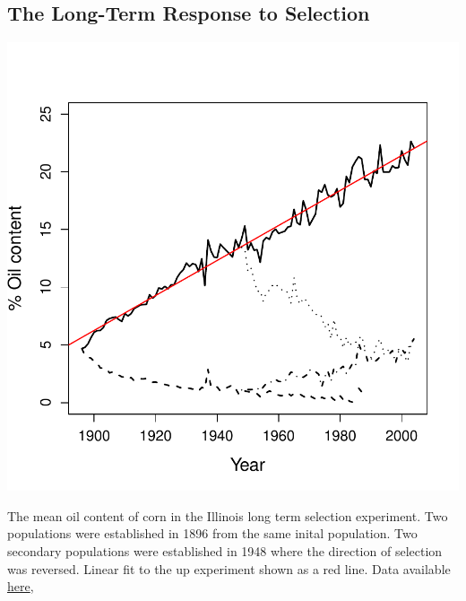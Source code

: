  \subsection{The Long-Term Response to Selection}
   \begin{marginfigure}
 \begin{center}
 \includegraphics[width=\textwidth]{Journal_figs/Quant_gen/Illinois_long_term_selection_corn/Illinois_LTS_means.pdf} \end{center}
 \caption[2cm]{The mean oil content of corn in the Illinois long term
   selection experiment. Two populations were established in 1896 from
 the same inital population. Two secondary populations were
 established in 1948 where the direction of selection was reversed.
 Linear fit to the up experiment shown as a red line. Data available \href{https://www.ideals.illinois.edu/handle/2142/3525}{here}, }\label{Fig:Illinois_LTS_means}
\end{marginfigure}

